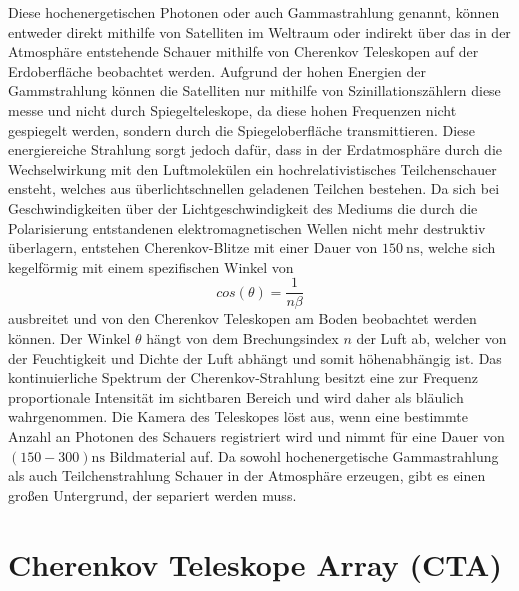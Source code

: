 Diese hochenergetischen Photonen oder auch Gammastrahlung genannt, können entweder direkt mithilfe von Satelliten im Weltraum oder indirekt über das in
der Atmosphäre entstehende Schauer mithilfe von Cherenkov Teleskopen auf der Erdoberfläche beobachtet werden.
Aufgrund der hohen Energien der Gammstrahlung können die Satelliten nur mithilfe von Szinillationszählern diese messe und nicht durch Spiegelteleskope,
da diese hohen Frequenzen nicht gespiegelt werden, sondern durch die Spiegeloberfläche transmittieren.
Diese energiereiche Strahlung sorgt jedoch dafür, dass in der Erdatmosphäre durch die Wechselwirkung mit den Luftmolekülen ein hochrelativistisches
Teilchenschauer ensteht, welches aus überlichtschnellen geladenen Teilchen bestehen.
Da sich bei Geschwindigkeiten über der Lichtgeschwindigkeit des Mediums die durch die Polarisierung entstandenen elektromagnetischen Wellen
nicht mehr destruktiv überlagern, entstehen Cherenkov-Blitze mit einer Dauer von $\SI{150}{\nano\s}$\cite{Cherenkov_Licht}, welche sich kegelförmig
mit einem spezifischen Winkel von
\begin{equation}
 cos(\theta) = \frac{1}{n\beta}
\end{equation}
ausbreitet und von den Cherenkov
Teleskopen am Boden beobachtet werden können.
Der Winkel $\theta$ hängt von dem Brechungsindex $n$ der Luft ab, welcher von der Feuchtigkeit und Dichte der Luft abhängt und somit höhenabhängig ist.
Das kontinuierliche Spektrum der Cherenkov-Strahlung besitzt eine zur Frequenz proportionale Intensität im sichtbaren Bereich und
wird daher als bläulich wahrgenommen.
Die Kamera des Teleskopes löst aus, wenn eine bestimmte Anzahl an Photonen des Schauers registriert wird und nimmt
für eine Dauer von $(150-300)\si{\nano\s}$ Bildmaterial auf.
Da sowohl hochenergetische Gammastrahlung als auch Teilchenstrahlung
Schauer in der Atmosphäre erzeugen, gibt es einen großen Untergrund, der separiert werden muss.

\section{Cherenkov Teleskope Array (CTA)}

